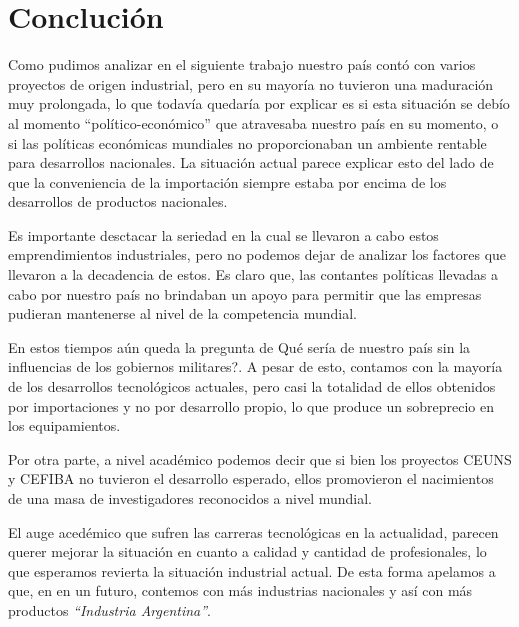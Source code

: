 \documentclass[%
 	final,
%
	notitlepage,
	narroweqnarray,
	inline,
 	twoside,
	]{ieee}
\begin{document}
\section{Concluci\'on}

Como pudimos analizar en el siguiente trabajo nuestro pa\'is cont\'o con varios proyectos de origen industrial, pero en su mayor\'ia no tuvieron una maduraci\'on muy prolongada, lo que todav\'ia quedar\'ia por explicar es si esta situaci\'on se deb\'io al momento ``pol\'itico-econ\'omico'' que atravesaba nuestro pa\'is en su momento, o si las pol\'iticas econ\'omicas mundiales no proporcionaban un ambiente rentable para desarrollos nacionales. La situaci\'on actual parece explicar esto del lado de que la conveniencia de la importaci\'on siempre estaba por encima de los desarrollos de productos nacionales.

Es importante desctacar la seriedad en la cual se llevaron a cabo estos emprendimientos industriales, pero no podemos dejar de analizar los factores que llevaron a la decadencia de estos. Es claro que, las contantes pol\'iticas llevadas a cabo por nuestro pa\'is no brindaban un apoyo para permitir que las empresas pudieran mantenerse al nivel de la competencia mundial.

En estos tiempos a\'un queda la pregunta de \textquestiondown Qu\'e ser\'ia de nuestro pa\'is sin la influencias de los gobiernos militares?.
A pesar de esto, contamos con la mayor\'ia de los desarrollos tecnol\'ogicos actuales, pero casi la totalidad de ellos obtenidos por importaciones y no por desarrollo propio, lo que produce un sobreprecio en los equipamientos.

Por otra parte, a nivel acad\'emico podemos decir que si bien los proyectos CEUNS y CEFIBA no tuvieron el desarrollo esperado, ellos promovieron el nacimientos de una masa de investigadores reconocidos a nivel mundial.

El auge aced\'emico que sufren las carreras tecnol\'ogicas en la actualidad, parecen querer mejorar la situaci\'on en cuanto a calidad y cantidad de profesionales, lo que esperamos revierta la situaci\'on industrial actual. De esta forma apelamos a que, en en un futuro, contemos con m\'as industrias nacionales y as\'i con m\'as productos \textit{``Industria Argentina''}.
\end{document}
